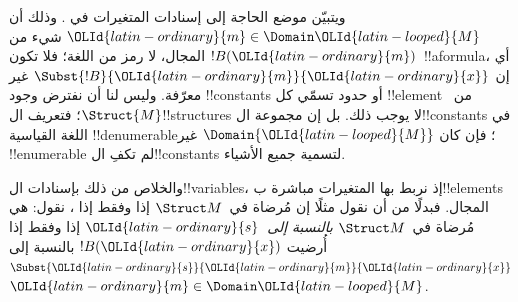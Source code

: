 \documentclass[../../../include/open-logic-section]{subfiles}
\begin{document}
\begin{explain}
ويتبيّن موضع الحاجة إلى إسنادات المتغيرات في
. وذلك أن $\OLId{latin-ordinary}{m} \in \Domain \OLId{latin-looped}{M}$
شيء من المجال، لا رمز من اللغة؛ فلا تكون $!B(\OLId{latin-ordinary}{m})$~!!a{formula}،
أي إن $\Subst{!B}{\OLId{latin-ordinary}{m}}{\OLId{latin-ordinary}{x}}$ غير معرّفة. وليس لنا أن نفترض وجود
!!{constant}s أو حدود تسمّي كل !!{element} من~$\Struct{M}$؛
فتعريف ال!!{structure}s لا يوجب ذلك. بل إن مجموعة
ال!!{constant}s في اللغة القياسية !!{denumerable}؛ فإن كان
$\Domain{\OLId{latin-looped}{M}}$ غير !!{enumerable} لم تكفِ ال!!{constant}s
لتسمية جميع الأشياء.

والخلاص من ذلك بإسنادات ال!!{variable}s، إذ نربط بها المتغيرات
مباشرة ب!!{element}s المجال. فبدلًا من أن نقول مثلًا إن
 مُرضاة
في~$\Struct M$ إذا وفقط إذا
،
نقول: هي مُرضاة في~$\Struct M$ \emph{بالنسبة إلى}~$\OLId{latin-ordinary}{s}$ إذا وفقط
إذا أُرضيت $!B(\OLId{latin-ordinary}{x})$ بالنسبة إلى~$\Subst{\OLId{latin-ordinary}{s}}{\OLId{latin-ordinary}{m}}{\OLId{latin-ordinary}{x}}$
 $\OLId{latin-ordinary}{m} \in \Domain \OLId{latin-looped}{M}$.
\end{explain}
\end{document}

